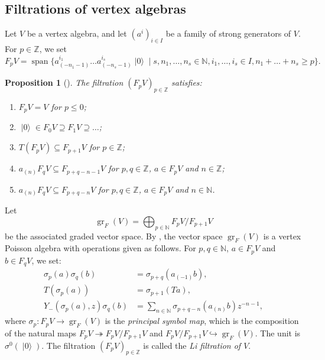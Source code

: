 \documentclass[a4paper, 12pt, reqno]{amsart}
\newtheorem{proposition}[theorem]{Proposition}
\theoremstyle{remark}
\DeclareMathOperator{\gr}{gr}
\DeclareMathOperator{\vspan}{span}
\DeclareMathOperator{\vac}{|0\rangle}
\begin{document}
\subsection{Filtrations of vertex algebras}
\label{sec:filtr-vert-algebr}

Let $V$ be a vertex algebra, and let $(a^i)_{i \in I}$ be a family of strong generators of $V$.
For $p \in \mathbb{Z}$, we set
\begin{equation*}
  F_pV = \vspan\{a^{i_1}_{(-n_1 - 1)}\dots a^{i_s}_{(-n_s - 1)}\vac \mid s, n_1, \dots, n_s \in \mathbb{N}, i_1, \dots, i_s \in I, n_1 + \dots + n_s \ge p\}.
\end{equation*}

\begin{proposition}[{\cite{li_abelianizing_2005}}]
  \label{prp:13}
  The filtration $(F_pV)_{p \in \mathbb{Z}}$ satisfies:
  \begin{enumerate}
  \item $F_pV = V$ for $p \le 0$;
  \item $\vac \in F_0V \supseteq F_1V \supseteq \dots$;
  \item $T(F_pV) \subseteq F_{p + 1}V$ for $p \in \mathbb{Z}$;
  \item $a_{(n)}F_qV \subseteq F_{p + q - n - 1}V$ for $p, q \in \mathbb{Z}$, $a \in F_pV$ and $n \in \mathbb{Z}$;
  \item $a_{(n)}F_qV \subseteq F_{p + q - n}V$ for $p, q \in \mathbb{Z}$, $a \in F_pV$ and $n \in \mathbb{N}$.
  \end{enumerate}
\end{proposition}

Let
\begin{equation*}
  \gr_F(V) = \bigoplus_{p \in \mathbb{N}}F_pV/F_{p + 1}V
\end{equation*}
be the associated graded vector space.
By \cite{li_abelianizing_2005}, the vector space $\gr_F(V)$ is a vertex Poisson algebra with operations given as follows.
For $p, q \in \mathbb{N}$, $a \in F_pV$ and $b \in F_qV$, we set:
\begin{align*}
  \sigma_p(a)\sigma_q(b) &= \sigma_{p + q}(a_{(-1)}b), \\
  T(\sigma_p(a)) &= \sigma_{p + 1}(Ta), \\
  Y_-(\sigma_p(a), z)\sigma_q(b) &= \sum_{n \in \mathbb{N}}\sigma_{p + q - n}(a_{(n)}b)z^{-n - 1},
\end{align*}
where $\sigma_p: F_pV \to \gr_F(V)$ is the \emph{principal symbol map}, which is the composition of the natural maps $F_pV \twoheadrightarrow F_pV/F_{p + 1}V$ and $F_pV/F_{p + 1}V \hookrightarrow \gr_F(V)$.
The unit is $\sigma^0(\vac)$.
The filtration $(F_pV)_{p \in \mathbb{Z}}$ is called the \emph{Li filtration of $V$}.
\end{document}
